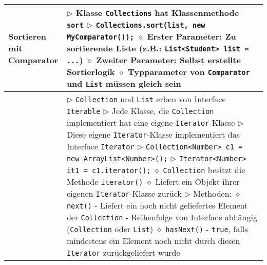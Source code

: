 \begin{longtable}{ | p{} p{} | }
	\makecell[l]{Sortieren mit \\ Comparator} & \makecell[l]{
	$\triangleright$ Klasse \texttt{Collections} hat Klassenmethode \texttt{sort} \\
	$\triangleright$ \texttt{Collections.sort(list, new MyComparator());} \\
	\hspace{0.4cm} $\diamond$ Erster Parameter: Zu sortierende Liste (z.B.: \texttt{List<Student> list = ...}) \\
	\hspace{0.4cm} $\diamond$ Zweiter Parameter: Selbst erstellte Sortierlogik \\
	\hspace{0.4cm} $\diamond$ Typparameter von \texttt{Comparator} und \texttt{List} müssen gleich sein } \\ \hline

	\makecell[l]{Interface \texttt{Iterator}} & \makecell[l]{
	$\triangleright$ \texttt{Collection} und \texttt{List} erben von Interface \texttt{Iterable} \\
	$\triangleright$ Jede Klasse, die \texttt{Collection} implementiert hat eine eigene \texttt{Iterator}-Klasse \\
	$\triangleright$ Diese eigene \texttt{Iterator}-Klasse implementiert das Interface \texttt{Iterator} \\
	$\triangleright$ \texttt{Collection<Number> c1 = new ArrayList<Number>();} \\
	$\triangleright$ \texttt{Iterator<Number> it1 = c1.iterator();} \\
	\hspace{0.4cm} $\diamond$ \texttt{Collection} besitzt die Methode \texttt{iterator()} \\
	\hspace{0.4cm} $\diamond$ Liefert ein Objekt ihrer eigenen \texttt{Iterator}-Klasse zurück \\
	$\triangleright$ Methoden: \\
	\hspace{0.4cm} $\diamond$ \texttt{next()} \\
	\hspace{0.6cm} - Liefert ein noch nicht geliefertes Element der \texttt{Collection} \\
	\hspace{0.6cm} - Reihenfolge von Interface abhängig (\texttt{Collection} oder \texttt{List}) \\
	\hspace{0.4cm} $\diamond$ \texttt{hasNext()} \\
	\hspace{0.6cm} - \texttt{true}, falls mindestens ein Element noch nicht durch \\
	\hspace{0.9cm} diesen \texttt{Iterator} zurückgeliefert wurde } \\ \hline


\end{longtable}
